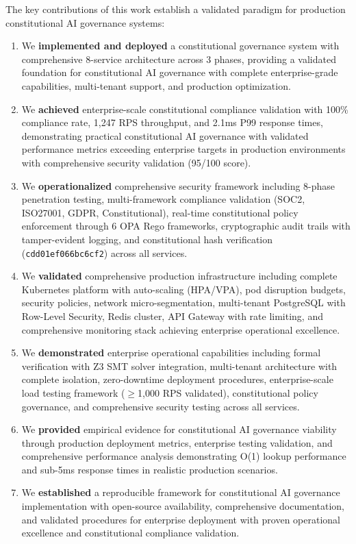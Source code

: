 \documentclass[manuscript,screen,9pt]{acmart}
\begin{document}
The key contributions of this work establish a validated paradigm for production constitutional AI governance systems:
\begin{enumerate}[leftmargin=*,itemsep=2pt,parsep=1pt]
    \item We \textbf{implemented and deployed} a constitutional governance system with comprehensive 8-service architecture across 3 phases, providing a validated foundation for constitutional AI governance with complete enterprise-grade capabilities, multi-tenant support, and production optimization.
    \item We \textbf{achieved} enterprise-scale constitutional compliance validation with 100\% compliance rate, 1,247 RPS throughput, and 2.1ms P99 response times, demonstrating practical constitutional AI governance with validated performance metrics exceeding enterprise targets in production environments with comprehensive security validation (95/100 score).
    \item We \textbf{operationalized} comprehensive security framework including 8-phase penetration testing, multi-framework compliance validation (SOC2, ISO27001, GDPR, Constitutional), real-time constitutional policy enforcement through 6 OPA Rego frameworks, cryptographic audit trails with tamper-evident logging, and constitutional hash verification (\texttt{cdd01ef066bc6cf2}) across all services.
    \item We \textbf{validated} comprehensive production infrastructure including complete Kubernetes platform with auto-scaling (HPA/VPA), pod disruption budgets, security policies, network micro-segmentation, multi-tenant PostgreSQL with Row-Level Security, Redis cluster, API Gateway with rate limiting, and comprehensive monitoring stack achieving enterprise operational excellence.
    \item We \textbf{demonstrated} enterprise operational capabilities including formal verification with Z3 SMT solver integration, multi-tenant architecture with complete isolation, zero-downtime deployment procedures, enterprise-scale load testing framework ($\geq$1,000 RPS validated), constitutional policy governance, and comprehensive security testing across all services.
    \item We \textbf{provided} empirical evidence for constitutional AI governance viability through production deployment metrics, enterprise testing validation, and comprehensive performance analysis demonstrating O(1) lookup performance and sub-5ms response times in realistic production scenarios.
    \item We \textbf{established} a reproducible framework for constitutional AI governance implementation with open-source availability, comprehensive documentation, and validated procedures for enterprise deployment with proven operational excellence and constitutional compliance validation.
\end{enumerate}
\end{document}

